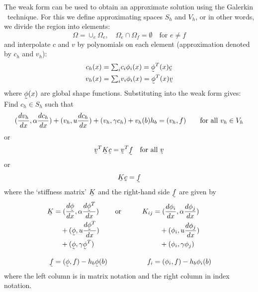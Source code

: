 The weak form can be used to obtain an approximate solution using the
Galerkin \fem\ technique. For this we define approximating 
spaces $S_h$ and $V_h$, or in other words, we divide the region into elements:
\begin{equation}
\Omega=\cup_e\Omega_e, \quad\Omega_{e}\cap\Omega_{f}=\emptyset\quad
   \text{for }e\neq f
\end{equation}
and interpolate $c$ and $v$ by
polynomials on each element (approximation denoted by $c_h$ and $v_h$):
\begin{align*}
    c_h(x)&=\tsum_i c_i\phi_i(x)=\col\phi^T(x)\col c
\\
    v_h(x)&=\tsum_i v_i\phi_i(x)=\col\phi^T(x)\col v
\end{align*}
where $\col\phi(x)$ are global shape functions.  Substituting into the
weak form gives:
Find $c_h\in S_h$ such that
\begin{equation}
   (\dfrac{d v_h}{d x},\alpha\dfrac{d c_h}{d x})+(v_h,u\dfrac{d c_h}{d x})+
           (v_h,\gamma{c_h})+v_h(b)h_b
      = (v_h,f)\qquad \text{for all }v_h\in V_h
\end{equation}
or
\[
 \col v^T\mat K\col c=
        \col v^T\col f \quad\text{for all }\col v
\]
or
\[
 \mat K\col c= \col f
\]
where the `stiffness matrix' $\mat K$ and
the right-hand side $\col f$ are given by
\begin{alignat*}{2}
 \mat K&=(\deriv{\col\phi}{x},\alpha\deriv{\col\phi^T}{x})\qquad\text{  or}&
   \qquad K_{ij}&=(\deriv{\phi_i}{x}, \alpha\deriv{\phi_j}{x}) \\
      &\quad+(\col\phi,u\deriv{\col\phi^T}{x})  &
       &\quad+(\phi_i,u\deriv{\phi_j}{x})\\
      &\quad+(\col\phi,\gamma\col\phi^T)  &
       &\quad+(\phi_i,\gamma\phi_j)\\[2ex]
\col f&= (\col\phi,f)-h_b\col\phi(b) &
f_i&= (\phi_i,f)-h_b\phi_i(b)
\end{alignat*}
where the left column is in matrix notation and the right column in index
notation.

